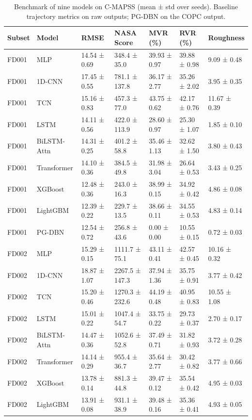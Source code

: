 \begin{table}
\caption{Benchmark of nine models on C-MAPSS (mean ± std over seeds). Baseline trajectory metrics on raw outputs; PG-DBN on the COPC output.}
\label{tab:table1_benchmark}
\begin{tabular}{lllllll}
\toprule
Subset & Model & RMSE & NASA Score & MVR (\%) & RVR (\%) & Roughness \\
\midrule
FD001 & MLP & 14.54 ± 0.69 & 348.4 ± 35.0 & 39.93 ± 0.97 & 39.88 ± 0.98 & 9.09 ± 0.48 \\
FD001 & 1D-CNN & 17.45 ± 0.55 & 781.1 ± 137.8 & 36.17 ± 2.77 & 35.26 ± 2.02 & 3.95 ± 0.35 \\
FD001 & TCN & 15.16 ± 0.83 & 457.3 ± 77.0 & 43.75 ± 0.62 & 42.17 ± 0.76 & 11.67 ± 0.39 \\
FD001 & LSTM & 14.11 ± 0.56 & 422.0 ± 113.9 & 28.60 ± 0.97 & 25.30 ± 1.07 & 1.85 ± 0.10 \\
FD001 & BiLSTM-Attn & 14.31 ± 0.25 & 401.2 ± 58.8 & 35.46 ± 1.13 & 32.62 ± 1.50 & 3.80 ± 0.43 \\
FD001 & Transformer & 14.10 ± 0.36 & 384.5 ± 49.8 & 31.98 ± 3.04 & 26.64 ± 0.53 & 3.43 ± 0.25 \\
FD001 & XGBoost & 12.48 ± 0.36 & 243.0 ± 16.3 & 38.99 ± 0.15 & 34.92 ± 0.42 & 4.86 ± 0.08 \\
FD001 & LightGBM & 12.39 ± 0.22 & 229.7 ± 13.5 & 38.66 ± 0.11 & 34.55 ± 0.53 & 4.83 ± 0.14 \\
FD001 & PG-DBN & 12.54 ± 0.72 & 256.8 ± 43.6 & 0.00 ± 0.00 & 10.55 ± 0.15 & 0.72 ± 0.03 \\
FD002 & MLP & 15.29 ± 0.15 & 1111.7 ± 75.1 & 43.11 ± 0.41 & 42.57 ± 0.45 & 10.16 ± 0.32 \\
FD002 & 1D-CNN & 18.87 ± 1.07 & 2267.5 ± 147.3 & 37.94 ± 1.36 & 35.75 ± 0.91 & 3.77 ± 0.42 \\
FD002 & TCN & 15.20 ± 0.46 & 1270.3 ± 232.6 & 44.19 ± 0.48 & 40.95 ± 0.83 & 10.55 ± 1.08 \\
FD002 & LSTM & 15.01 ± 0.22 & 1047.4 ± 54.7 & 33.75 ± 0.22 & 29.73 ± 0.37 & 2.70 ± 0.17 \\
FD002 & BiLSTM-Attn & 14.47 ± 0.36 & 1052.6 ± 52.8 & 37.49 ± 0.71 & 31.82 ± 0.93 & 3.72 ± 0.28 \\
FD002 & Transformer & 14.14 ± 0.29 & 955.4 ± 36.7 & 35.64 ± 2.77 & 30.42 ± 0.82 & 3.77 ± 0.66 \\
FD002 & XGBoost & 13.78 ± 0.14 & 881.3 ± 44.8 & 39.47 ± 0.12 & 35.54 ± 0.42 & 4.95 ± 0.03 \\
FD002 & LightGBM & 13.91 ± 0.08 & 931.1 ± 38.9 & 39.48 ± 0.16 & 35.36 ± 0.41 & 4.93 ± 0.05 \\

\end{tabular}
\end{table}
